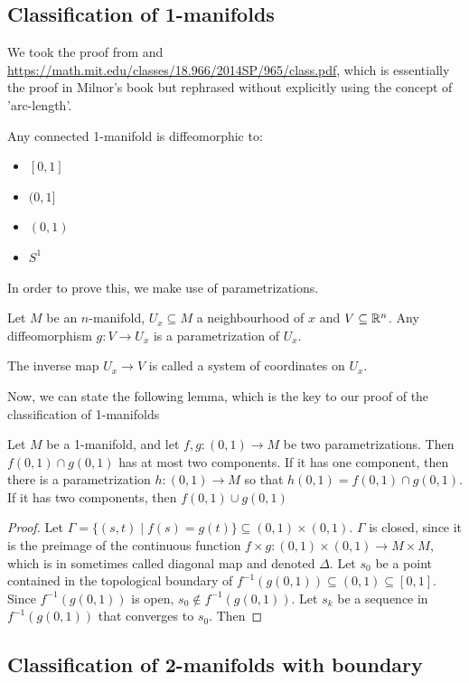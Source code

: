 \subsection{Classification of 1-manifolds}
We took the proof from \cite[Appendix]{Milnor1997topology} and
 \url{https://math.mit.edu/classes/18.966/2014SP/965/class.pdf}, which is essentially the proof in
 Milnor's book but rephrased without explicitly using the concept of 'arc-length'.
\begin{thm}
Any connected 1-manifold is diffeomorphic to:
\begin{itemize}
    \item $[0,1]$
    \item $(0,1]$
    \item $(0,1)$
    \item $S^1$
\end{itemize}
\end{thm}
In order to prove this, we make use of parametrizations.
\begin{defn}[Parametrization]
Let $M$ be an $n$-manifold, $U_x\subseteq M$ a neighbourhood of $x$ and 
$V\subseteq \mathbb{R}^n$. 
Any diffeomorphism $g:V\to U_x$ is a parametrization of $U_x$.

The inverse map $U_x\to V$ is called a system of coordinates on $U_x$.
\end{defn}
Now, we can state the following lemma, which is the key to our proof of the classification of
 1-manifolds 
\begin{lem}
    Let $M$ be a 1-manifold, and let $f,g:(0,1)\to M$ be two parametrizations. Then
     $f(0,1)\cap g(0,1)$ has at most two components. If it has one component, then there is 
     a parametrization $h:(0,1)\to M$ so that $h(0,1)=f(0,1)\cap g(0,1)$. If it has two components,
     then $f(0,1)\cup g(0,1)$
\end{lem}
\begin{proof}
Let $\Gamma =\{(s,t)\mid f(s)=g(t)\}\subseteq (0,1)\times (0,1)$. $\Gamma$ is closed, since 
it is the preimage of the continuous function $f\times g:(0,1)\times (0,1)\to  M\times M$, which is
in sometimes called diagonal map and denoted $\Delta $.
Let $s_0$ be a point contained in the topological boundary of 
$f^{-1}(g(0,1))\subseteq (0,1)\subseteq [0,1]$. Since $f^{-1}(g(0,1))$ is open,
 $s_0\notin f^{-1}(g(0,1))$. Let $s_k$ be a sequence in $f^{-1}(g(0,1))$ that converges to $s_0$.
 Then 

\end{proof}
\subsection{Classification of 2-manifolds with boundary}
\label{sub:classification_of_2_manifolds_with_boundary}

